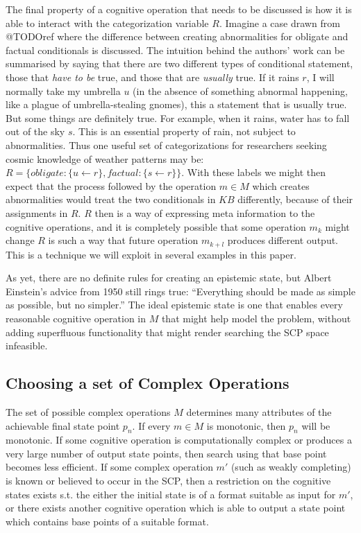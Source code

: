 \documentclass{article}
\begin{document}
The final property of a cognitive operation that needs to be discussed is how it is able to interact with the categorization variable $R$. Imagine a case drawn from @TODOref where the difference between creating abnormalities for obligate and factual conditionals is discussed. The intuition behind the authors' work can be summarised by saying that there are two different types of conditional statement, those that \textit{have to be} true, and those that are \textit{usually} true. If it rains $r$, I will normally take my umbrella $u$ (in the absence of something abnormal happening, like a plague of umbrella-stealing gnomes), this a statement that is usually true. But some things are definitely true. For example, when it rains, water has to fall out of the sky $s$. This is an essential property of rain, not subject to abnormalities. Thus one useful set of categorizations for researchers seeking cosmic knowledge of weather patterns may be: $R=\{obligate: \{u \leftarrow r\}, factual: \{s \leftarrow r\} \}$. With these labels we might then expect that the process followed by the operation $m \in M$ which creates abnormalities would treat the two conditionals in $KB$ differently, because of their assignments in $R$. $R$ then is a way of expressing meta information to the cognitive operations, and it is completely possible that some operation $m_k$ might change $R$ is such a way that future operation $m_{k+l}$ produces different output. This is a technique we will exploit in several examples in this paper.

As yet, there are no definite rules for creating an epistemic state, but Albert Einstein's advice from 1950 still rings true: ``Everything should be made as simple as possible, but no simpler.'' The ideal epistemic state is one that enables every reasonable cognitive operation in $M$ that might help model the problem, without adding superfluous functionality that might render searching the SCP space infeasible.
\subsection{Choosing a set of Complex Operations}
The set of possible complex operations $M$ determines many attributes of the achievable final state point $p_n$. If every $m \in M$ is monotonic, then $p_n$ will be monotonic. If some cognitive operation is computationally complex or produces a very large number of output state points, then search using that base point becomes less efficient. If some complex operation $m'$ (such as weakly completing) is known or believed to occur in the SCP, then a restriction on the cognitive states exists s.t. the either the initial state is of a format suitable as input for $m'$, or there exists another cognitive operation which is able to output a state point which contains base points of a suitable format.
\end{document}

